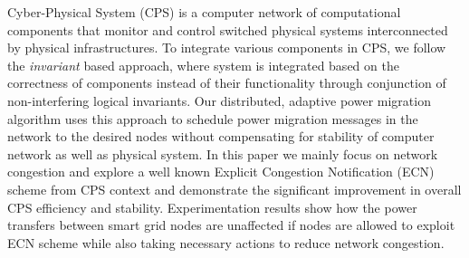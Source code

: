 \label{sec:abstract}

Cyber-Physical System (CPS) is a computer network of computational components that monitor and control switched physical systems interconnected by physical infrastructures. To integrate various components in CPS, we follow the \textit{invariant} based approach, where system is integrated based on the correctness of components instead of their functionality through conjunction of non-interfering logical invariants. Our distributed, adaptive power migration algorithm uses this approach to schedule power migration messages in the network to the desired nodes without compensating for stability of computer network as well as physical system. In this paper we mainly focus on network congestion and explore a well known Explicit Congestion Notification (ECN) scheme from CPS context and demonstrate the significant improvement in overall CPS efficiency and stability. Experimentation results show how the power transfers between smart grid nodes are unaffected if nodes are allowed to exploit ECN scheme while also taking necessary actions to reduce network congestion.



